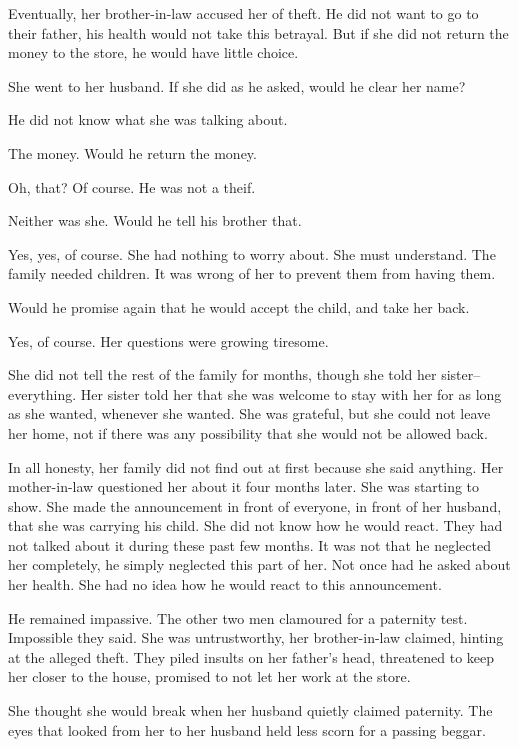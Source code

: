 \documentclass{article}
\begin{document}
Eventually, her brother-in-law accused her of theft. He did not want to go to their father, his health would not take this betrayal. But if she did not return the money to the store, he would have little choice. 

She went to her husband. If she did as he asked, would he clear her name?

He did not know what she was talking about.

The money. Would he return the money. 

Oh, that? Of course. He was not a theif.

Neither was she. Would he tell his brother that.

Yes, yes, of course. She had nothing to worry about. She must understand. The family needed children. It was wrong of her to prevent them from having them.

Would he promise again that he would accept the child, and take her back.

Yes, of course. Her questions were growing tiresome.

\vspace{.5 cm}

She did not tell the rest of the family for months, though she told her sister-- everything. Her sister told her that she was welcome to stay with her for as long as she wanted, whenever she wanted. She was grateful, but she could not leave her home, not if there was any possibility that she would not be allowed back.

In all honesty, her family did not find out at first because she said anything. Her mother-in-law questioned her about it four months later. She was starting to show. She made the announcement in front of everyone, in front of her husband, that she was carrying his child. She did not know how he would react. They had not talked about it during these past few months. It was not that he neglected her completely, he simply neglected this part of her. Not once had he asked about her health. She had no idea how he would react to this announcement. 

He remained impassive. The other two men clamoured for a paternity test. Impossible they said. She was untrustworthy, her brother-in-law claimed, hinting at the alleged theft. They piled insults on her father's head, threatened to keep her closer to the house, promised to not let her work at the store.

She thought she would break when her husband quietly claimed paternity. The eyes that looked from her to her husband held less scorn for a passing beggar. 
\end{document}
